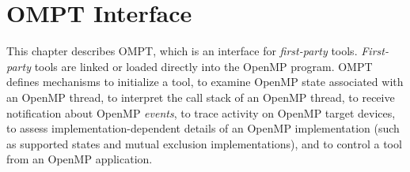 %
%
%
%
%
%
%
%
%
%
%
%
%


\chapter{OMPT Interface}
\label{sec:OMPT Interface}
\label{chap:OMPT Interface}
\label{sec:ompt-overview}

This chapter describes OMPT, which is an interface for \emph{first-party}
tools. \emph{First-party} tools are linked or loaded directly into the OpenMP 
program. OMPT defines mechanisms to initialize a tool, to examine OpenMP state 
associated with an OpenMP thread, to interpret the call stack of an OpenMP 
thread, to receive notification about OpenMP \emph{events}, to trace activity 
on OpenMP target devices, to assess implementation-dependent details of an 
OpenMP implementation (such as supported states and mutual exclusion 
implementations), and to control a tool from an OpenMP application.

